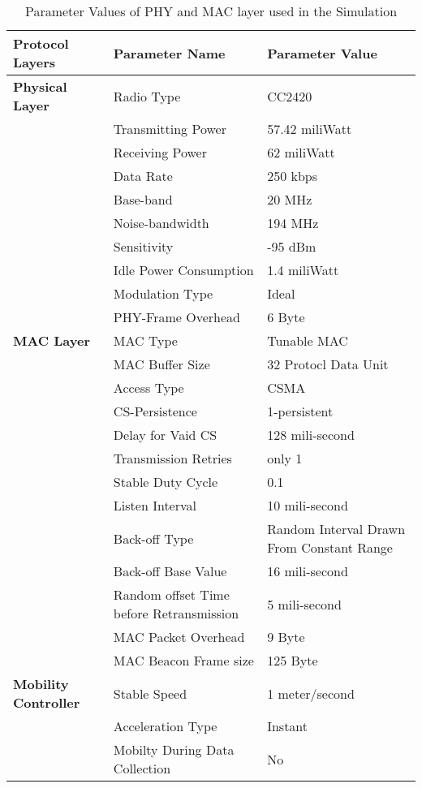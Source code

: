 \documentclass{llncs}
\begin{document}
  \begin{table}[hbt]
	\centering
	\begin{tabular}{| p{4 cm}  | p{4 cm} | p{4 cm} |}
		\hline
		 \textbf{Protocol Layers} & \centering \textbf{Parameter Name} & \textbf{Parameter Value}\\
		 \hline
		\textbf{Physical Layer} & Radio Type & CC2420  \\ \cline{2-3}
								& Transmitting Power & 57.42 miliWatt \\ \cline{2-3}
								& Receiving Power & 62 miliWatt \\ \cline{2-3}
								& Data Rate & 250 kbps \\ \cline{2-3} 
								& Base-band & 20 MHz\\ \cline{2-3}
								& Noise-bandwidth & 194 MHz\\ \cline{2-3}
								& Sensitivity & -95 dBm\\ \cline{2-3}
								& Idle Power Consumption & 1.4 miliWatt\\ \cline{2-3}
								& Modulation Type & Ideal\\ \cline{2-3}
								& PHY-Frame Overhead & 6 Byte \\
		\hline
		\textbf{MAC Layer} 		& MAC Type & Tunable MAC \\ \cline{2-3}
								& MAC Buffer Size & 32 Protocl Data Unit\\ \cline{2-3}
								& Access Type & CSMA\\ \cline{2-3}
								& CS-Persistence & 1-persistent \\ \cline{2-3} 
								& Delay for Vaid CS & 128 mili-second \\ \cline{2-3}
								& Transmission Retries & only 1 \\  \cline{2-3}
								& Stable Duty Cycle & 0.1\\ \cline{2-3}
								& Listen Interval & 10 mili-second\\ \cline{2-3}
								& Back-off Type & Random Interval Drawn From Constant Range\\ \cline{2-3}
								& Back-off Base Value & 16 mili-second \\ \cline{2-3}
								& Random offset Time before Retransmission & 5 mili-second \\ \cline{2-3}
								& MAC Packet Overhead & 9 Byte \\ \cline{2-3}
								& MAC Beacon Frame size & 125 Byte \\ \cline{2-3}
		\hline
		\textbf{Mobility Controller} & Stable Speed & 1 meter/second \\ \cline{2-3}
									 & Acceleration Type & Instant \\ \cline{2-3}
									 & Mobilty During Data Collection & No \\
	    \hline
	\end{tabular}
	\caption{Parameter Values of PHY and MAC layer used in the Simulation}
	\label{table:params_mac_phy} 
\end{table}	
\end{document}
